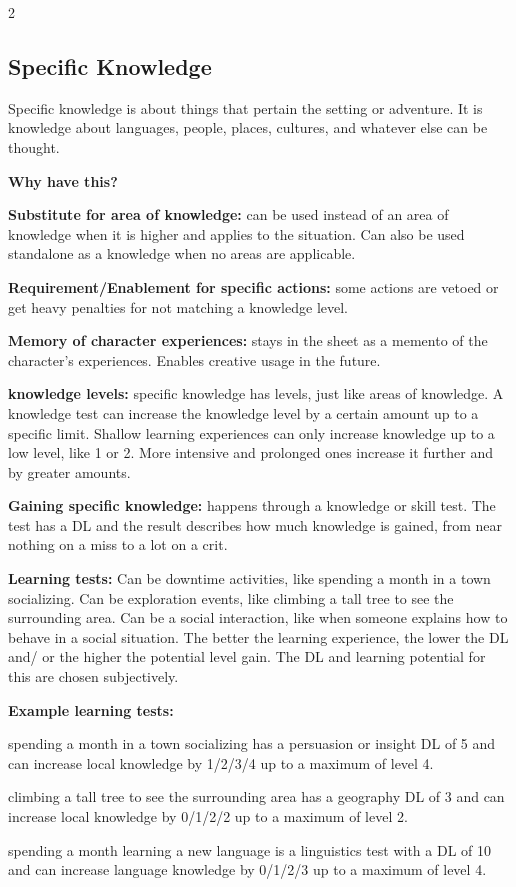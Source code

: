\begin{multicols}{2}
\subsection{Specific Knowledge}

Specific knowledge is about things that pertain the setting or adventure. It is knowledge about languages, people, places, cultures, and whatever else can be thought. 

\textbf{Why have this?}

\begin{proplist}
    \item \textbf{Substitute for area of knowledge:} can be used instead of an area of knowledge when it is higher and applies to the situation. Can also be used standalone as a knowledge when no areas are applicable.
    \item \textbf{Requirement/Enablement for specific actions:} some actions are vetoed or get heavy penalties for not matching a knowledge level.
    \item \textbf{Memory of character experiences:} stays in the sheet as a memento of the character's experiences. Enables creative usage in the future.
\end{proplist}

\textbf{knowledge levels:} specific knowledge has levels, just like areas of knowledge. A knowledge test can increase the knowledge level by a certain amount up to a specific limit. Shallow learning experiences can only increase knowledge up to a low level, like 1 or 2. More intensive and prolonged ones increase it further and by greater amounts.

\textbf{Gaining specific knowledge:} happens through a knowledge or skill test. The test has a DL and the result describes how much knowledge is gained, from near nothing on a miss to a lot on a crit.

\textbf{Learning tests:} Can be downtime activities, like spending a month in a town socializing. Can be exploration events, like climbing a tall tree to see the surrounding area. Can be a social interaction, like when someone explains how to behave in a social situation. The better the learning experience, the lower the DL and/ or the higher the potential level gain. The DL and learning potential for this are chosen subjectively.

\textbf{Example learning tests:}

\begin{proplist}
    \item spending a month in a town socializing has a persuasion or insight DL of 5 and can increase local knowledge by 1/2/3/4 up to a maximum of level 4.
    \item climbing a tall tree to see the surrounding area has a geography DL of 3 and can increase local knowledge by 0/1/2/2 up to a maximum of level 2.
    \item spending a month learning a new language is a linguistics test with a DL of 10 and can increase language knowledge by 0/1/2/3 up to a maximum of level 4.
\end{proplist}


\end{multicols}
